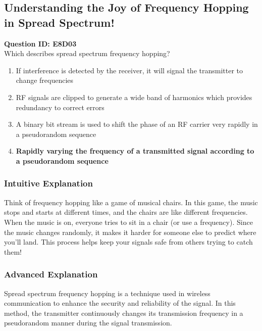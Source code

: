 \subsection{Understanding the Joy of Frequency Hopping in Spread Spectrum!}

\begin{tcolorbox}[colback=blue!10!white, colframe=blue!80!black, title=Question E8D03]
    \textbf{Question ID: E8D03} \\
    Which describes spread spectrum frequency hopping? \\
    \begin{enumerate}[label=\Alph*.]
        \item If interference is detected by the receiver, it will signal the transmitter to change frequencies
        \item RF signals are clipped to generate a wide band of harmonics which provides redundancy to correct errors
        \item A binary bit stream is used to shift the phase of an RF carrier very rapidly in a pseudorandom sequence
        \item \textbf{Rapidly varying the frequency of a transmitted signal according to a pseudorandom sequence}
    \end{enumerate}
\end{tcolorbox}

\subsubsection{Intuitive Explanation}
Think of frequency hopping like a game of musical chairs. In this game, the music stops and starts at different times, and the chairs are like different frequencies. When the music is on, everyone tries to sit in a chair (or use a frequency). Since the music changes randomly, it makes it harder for someone else to predict where you'll land. This process helps keep your signals safe from others trying to catch them!

\subsubsection{Advanced Explanation}
Spread spectrum frequency hopping is a technique used in wireless communication to enhance the security and reliability of the signal. In this method, the transmitter continuously changes its transmission frequency in a pseudorandom manner during the signal transmission.


